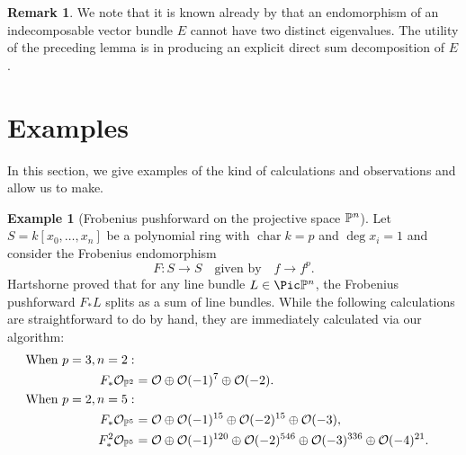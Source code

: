 \documentclass[12pt]{article}
\def\OO{\mathcal O}
\theoremstyle{theorem}
\numberwithin{thm}{section}
\theoremstyle{definition}
\newtheorem{exa}[thm]{Example}
\newtheorem{rem}[thm]{Remark}
\begin{document}
\begin{rem}
  We note that it is known already by \cite[Proposition~15]{Atiyah57} that an endomorphism of an indecomposable vector bundle $E$ cannot have two distinct eigenvalues. The utility of the preceding lemma is in producing an explicit direct sum decomposition of $E$.
\end{rem}


\section{Examples}\label{sec:examples}

In this section, we give examples of the kind of calculations and observations  and  allow us to make.

\renewcommand{\char}{\operatorname{char}}

\begin{exa}[Frobenius pushforward on the projective space $\P^n$]
  Let $S = k[x_0,\dots,x_n]$ be a polynomial ring with $\char k = p$ and $\deg x_i = 1$ and consider the Frobenius endomorphism
  \[ F\colon S\to S \quad \text{given by} \quad f \to f^p. \]
  Hartshorne \cite{Hartshorne1970} proved that for any line bundle $L\in\Pic\P^n$, the Frobenius pushforward $F_*L$ splits as a sum of line bundles. While the following calculations are straightforward to do by hand, they are immediately calculated via our algorithm:
  \begin{align*}
    \text{When }p=3, n=2: \\
    F_*\OO_{\P^2} &= \OO \oplus \OO(-1)^7 \oplus \OO(-2). \\
    \text{When } p=2, n=5: \\
    F_*\OO_{\P^5} &= \OO \oplus \OO(-1)^{15} \oplus \OO(-2)^{15} \oplus \OO(-3), \\
    F_*^2\OO_{\P^5} &= \OO \oplus \OO(-1)^{120} \oplus \OO(-2)^{546} \oplus \OO(-3)^{336} \oplus \OO(-4)^{21}.
  \end{align*}
\end{exa}
\end{document}
